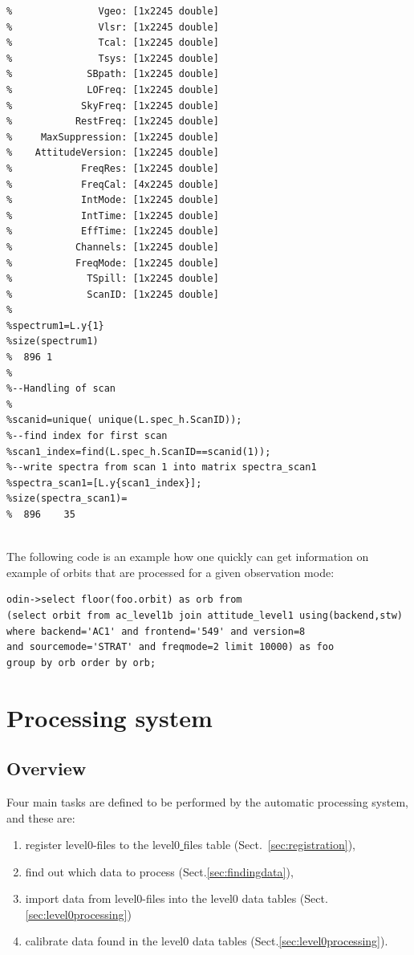 \documentclass[12pt]{article}
\begin{document}
\begin{enumerate}
\begin{verbatim}
%               Vgeo: [1x2245 double]
%               Vlsr: [1x2245 double]
%               Tcal: [1x2245 double]
%               Tsys: [1x2245 double]
%             SBpath: [1x2245 double]
%             LOFreq: [1x2245 double]
%            SkyFreq: [1x2245 double]
%           RestFreq: [1x2245 double]
%     MaxSuppression: [1x2245 double]
%    AttitudeVersion: [1x2245 double]
%            FreqRes: [1x2245 double]
%            FreqCal: [4x2245 double]
%            IntMode: [1x2245 double]
%            IntTime: [1x2245 double]
%            EffTime: [1x2245 double]
%           Channels: [1x2245 double]
%           FreqMode: [1x2245 double]
%             TSpill: [1x2245 double]
%             ScanID: [1x2245 double]
%
%spectrum1=L.y{1} 
%size(spectrum1)
%  896 1
%
%--Handling of scan
% 
%scanid=unique( unique(L.spec_h.ScanID));
%--find index for first scan                 
%scan1_index=find(L.spec_h.ScanID==scanid(1));
%--write spectra from scan 1 into matrix spectra_scan1
%spectra_scan1=[L.y{scan1_index}];
%size(spectra_scan1)=
%  896    35


\end{verbatim}
\end{enumerate}

The following code is an example how one quickly can get information
on example of orbits that are processed for a given observation mode:
\begin{verbatim}
odin->select floor(foo.orbit) as orb from  
(select orbit from ac_level1b join attitude_level1 using(backend,stw)
where backend='AC1' and frontend='549' and version=8
and sourcemode='STRAT' and freqmode=2 limit 10000) as foo
group by orb order by orb;
\end{verbatim} 



\section{Processing system}
\subsection{Overview}
Four main tasks are defined to be performed by the 
automatic processing system, 
and these are:
\begin{enumerate}
\item register level0-files to the level0\underline{ }files table
(Sect.~\ref{sec:registration}),
\item find out which data to process (Sect.\ref{sec:findingdata}),
\item import data from level0-files into the level0 data tables
(Sect.\ref{sec:level0processing})
\item calibrate data found in the level0 data tables
(Sect.\ref{sec:level0processing}).
\end{enumerate}
\end{document}
